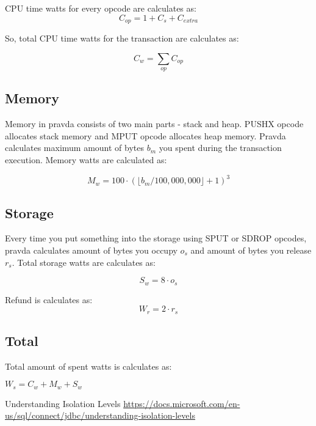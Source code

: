 \documentclass[12pt,a4paper]{article}
\begin{document}
CPU time watts for every opcode are calculates as:
$$ C_{op} = 1 + C_{s} + C_{extra} $$ 


So, total CPU time watts for the transaction are calculates as:

$$ C_w = \sum_{op} C_{op} $$ 

\subsection{Memory}

Memory in pravda consists of two main parts - stack and heap. PUSHX opcode allocates stack memory and MPUT opcode allocates heap memory. Pravda calculates maximum amount of bytes $b_m$ you spent during the transaction execution. Memory watts are calculated as:

$$M_w = 100\cdot(\lfloor b_m/100,000,000 \rfloor + 1)^3 $$

\subsection{Storage}

Every time you put something into the storage using SPUT or SDROP opcodes, pravda calculates amount of bytes you occupy $o_s$ and amount of bytes you release $r_s$. Total storage watts are calculates as:

$$S_w = 8 \cdot o_s $$

Refund is calculates as:
$$W_r = 2 \cdot r_s $$

\subsection{Total}

Total amount of spent watts is calculates as:

$W_s = C_w + M_w + S_w$

\begin{thebibliography}{9}

 Understanding Isolation Levels \url{https://docs.microsoft.com/en-us/sql/connect/jdbc/understanding-isolation-levels}
\end{thebibliography}
\end{document}
